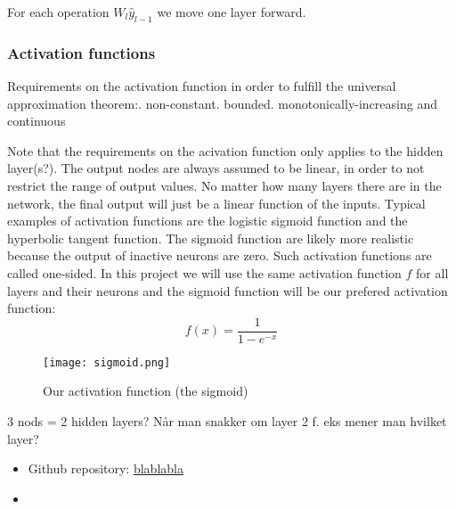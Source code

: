 \documentclass[a4paper,12pt]{article}
\begin{document}
For each operation $W_l \hat{y}_{l-1}$ we move one layer forward.\newline

\subsubsection{Activation functions}
Requirements on the activation function in order to fulfill the universal approximation theorem:. non-constant. bounded. monotonically-increasing and continuous\newline

Note that the requirements on the acivation function only applies to the hidden layer(s?). The output nodes are always assumed to be linear, in order to not restrict the range of output values. No matter how many layers there are in the network, the final output will just be a linear function of the inputs.\newline
Typical examples of activation functions are the logistic sigmoid function and the hyperbolic tangent function. The sigmoid function are likely more realistic because the output of inactive neurons are zero. Such activation functions are called one-sided. In this project we will use the same activation function $f$ for all layers and their neurons and the sigmoid function will be our prefered activation function: 
\begin{equation}
    f(x) = \frac{1}{ 1 - e^{-x} }
\end{equation}

\begin{figure}[h!]
  \centering
  \caption{Our activation function (the sigmoid)}
  \texttt{[image: sigmoid.png]}
\end{figure}



3 nods = 2 hidden layers? Når man snakker om layer 2 f. eks mener man hvilket layer?\newline

\begin{itemize}
\item Github repository: \url{blablabla}
\item
\end{itemize}
\end{document}
